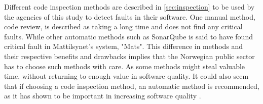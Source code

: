 
Different code inspection methods are described in \autoref{sec:inspection} to be used by the agencies of this study to detect faults in their software. One manual method, code review, is described as taking a long time and does not find any critical faults. While other automatic methods such as SonarQube is said to have found critical fault in Mattilsynet's system, "Mats". This difference in methods and their respective benefits and drawbacks implies that the Norwegian public sector has to choose such methods with care. As some methods might steal valuable time, without returning to enough value in software quality. It could also seem that if choosing a code inspection method, an automatic method is recommended, as it has shown to be important in increasing software quality \cite{smm_2018}.


